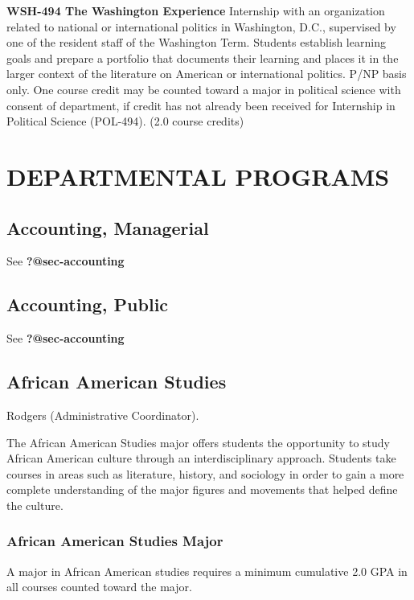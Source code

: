 \documentclass[
  letterpaper,
]{scrbook}
\begin{document}
\textbf{WSH-494 The Washington Experience} Internship with an
organization related to national or international politics in
Washington, D.C., supervised by one of the resident staff of the
Washington Term. Students establish learning goals and prepare a
portfolio that documents their learning and places it in the larger
context of the literature on American or international politics. P/NP
basis only. One course credit may be counted toward a major in political
science with consent of department, if credit has not already been
received for Internship in Political Science (POL-494). (2.0 course
credits)

\chapter{DEPARTMENTAL PROGRAMS}\label{departmental-programs}

\section{Accounting, Managerial}\label{accounting-managerial}

See \textbf{?@sec-accounting}

\section{Accounting, Public}\label{accounting-public}

See \textbf{?@sec-accounting}

\section{African American Studies}\label{african-american-studies}

Rodgers (Administrative Coordinator).

The African American Studies major offers students the opportunity to
study African American culture through an interdisciplinary approach.
Students take courses in areas such as literature, history, and
sociology in order to gain a more complete understanding of the major
figures and movements that helped define the culture.

\subsection{African American Studies
Major}\label{african-american-studies-major}

A major in African American studies requires a minimum cumulative 2.0
GPA in all courses counted toward the major.
\end{document}
